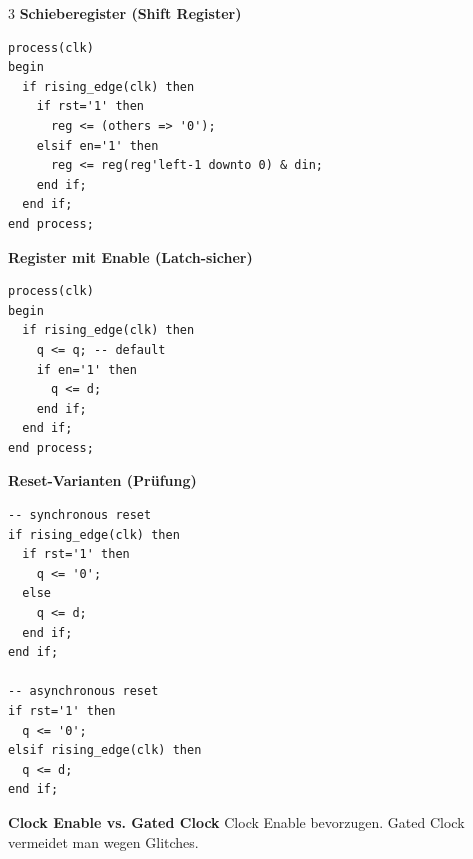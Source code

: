 \documentclass[10pt,a4paper]{article}
\begin{document}
\begin{multicols}{3}
\textbf{Schieberegister (Shift Register)}
\begin{lstlisting}
process(clk)
begin
  if rising_edge(clk) then
    if rst='1' then
      reg <= (others => '0');
    elsif en='1' then
      reg <= reg(reg'left-1 downto 0) & din;
    end if;
  end if;
end process;
\end{lstlisting}

\textbf{Register mit Enable (Latch-sicher)}
\begin{lstlisting}
process(clk)
begin
  if rising_edge(clk) then
    q <= q; -- default
    if en='1' then
      q <= d;
    end if;
  end if;
end process;
\end{lstlisting}

\textbf{Reset-Varianten (Prüfung)}
\begin{lstlisting}
-- synchronous reset
if rising_edge(clk) then
  if rst='1' then
    q <= '0';
  else
    q <= d;
  end if;
end if;

-- asynchronous reset
if rst='1' then
  q <= '0';
elsif rising_edge(clk) then
  q <= d;
end if;
\end{lstlisting}

\textbf{Clock Enable vs. Gated Clock}
Clock Enable bevorzugen. Gated Clock vermeidet man wegen Glitches.

\end{multicols}
\end{document}
